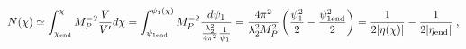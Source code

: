 \begin{equation}
N(\chi) \simeq \int_{\chi_{\rm end}}^{\chi} M_P^{-2} \frac{V}{V'}d\chi
= \int_{\psi_{1{\rm end}}}^{\psi_1(\chi)} M_P^{-2}
\frac{d\psi_1}{\frac{\lambda_2^2}{4\pi^2}\frac{1}{\psi_1}}
= \frac{4\pi^2}{\lambda_2^2 M_P^2} \left( \frac{\psi_1^2}{2} -
\frac{\psi_{1{\rm end}}^2}{2} \right)
= \frac{1}{2|\eta(\chi)|}- \frac{1}{2|\eta_{\rm end}|} \;,
\end{equation}


